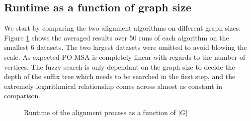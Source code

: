 \documentclass[thesis.tex]{subfiles}
\begin{document}
\subsection*{Runtime as a function of graph size}
We start by comparing the two alignment algorithms on different graph sizes. Figure \ref{fig:runtime_G} shows the averaged results over 50 runs of each algorithm on the smallest 6 datasets. The two largest datasets were omitted to avoid blowing the scale. As expected PO-MSA is completely linear with regards to the number of vertices. The fuzzy search is only dependant on the graph size to decide the depth of the suffix tree which needs to be searched in the first step, and the extremely logarithmical relationship comes across almost as constant in comparison.
\clearpage
\begin{figure}[!ht]
  \caption{Runtime of the alignment process as a function of $|G|$}
  \label{fig:runtime_G}
\end{figure}
\end{document}
